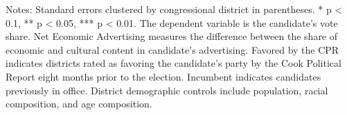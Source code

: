 \begin{table}[htbp]
   \par \raggedright 
   \footnotesize Notes: Standard errors clustered by congressional district in parentheses. * p < 0.1, ** p < 0.05, *** p < 0.01. The dependent variable is the candidate's vote share. Net Economic Advertising measures the difference between the share of economic and cultural content in candidate's advertising. Favored by the CPR indicates districts rated as favoring the candidate's party by the Cook Political Report eight months prior to the election. Incumbent indicates candidates previously in office. District demographic controls include population, racial composition, and age composition.
\end{table}


